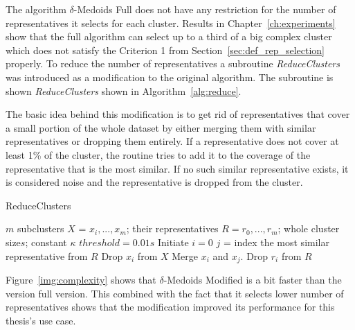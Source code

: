 \documentclass[thesis=B,english]{FITthesis}[2012/10/20]
\begin{document}
The algorithm $\delta$-Medoids Full does not have any restriction for the number of representatives it selects for each cluster.
Results in Chapter~\ref{ch:experiments} show that the full algorithm can select up to a third of a big complex cluster which does not satisfy the Criterion 1 from Section~\ref{sec:def_rep_selection} properly.
To reduce the number of representatives a subroutine \textit{ReduceClusters} was introduced as a modification to the original algorithm.
The subroutine is shown \textit{ReduceClusters} shown in Algorithm~\ref{alg:reduce}.

The basic idea behind this modification is to get rid of representatives that cover a small portion of the whole dataset by either merging them with similar representatives or dropping them entirely.
If a representative does not cover at least 1\% of the cluster, the routine tries to add it to the coverage of the representative that is the most similar.
If no such similar representative exists, it is considered noise and the representative is dropped from the cluster.

\begin{algorithm}
    \caption{ReduceClusters}
    \label{alg:reduce}
    \begin{algorithmic}[1]
        \INPUT $m$ subclusters $X$ = $x_i, ..., x_m$; their representatives $R = r_0, ..., r_m$; whole cluster size$s$; constant $\kappa$
        \STATE $threshold = 0.01s$
        \STATE Initiate $i = 0$
                    \STATE $j$ = index the most similar representative from $R$
                        \STATE Drop $x_i$ from $X$
                    \ELSE
                        \STATE Merge $x_i$ and $x_j$.
                    \ENDIF
                    \STATE Drop $r_i$ from $R$
                \ENDIF
            \ENDWHILE
        \ENDIF
    \end{algorithmic}
\end{algorithm}

Figure~\ref{img:complexity} shows that $\delta$-Medoids Modified is a bit faster than the version full version.
This combined with the fact that it selects lower number of representatives shows that the modification improved its performance for this thesis's use case.
\end{document}
